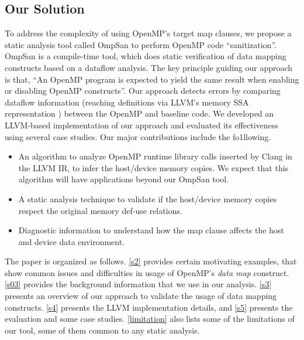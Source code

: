 \subsection{Our Solution}
To address the complexity of using OpenMP's target map 
clauses, we propose a static analysis 
tool called OmpSan to perform OpenMP code ``sanitization''.
OmpSan is a compile-time tool, which does static verification 
of data mapping constructs based on a dataflow analysis.
The key principle guiding our approach is that, ``An OpenMP program is expected to yield the same result when enabling
or disabling OpenMP constructs''.
Our approach detects errors by comparing 
dataflow information (reaching definitions via
LLVM's memory SSA representation \cite{llvm-memoryssa-url}) 
between the OpenMP and baseline code.  We developed an
LLVM-based implementation of our approach and evaluated its
effectiveness using several case studies.
Our major contributions include the fo1llowing.
\begin{itemize}
\vspace{-3pt}
\item An algorithm to analyze OpenMP runtime library calls inserted by Clang in the LLVM IR, to infer the host/device memory copies. We expect 
that this algorithm will have applications beyond our OmpSan tool. 
\item A static analysis technique to validate if the host/device memory copies respect the original memory def-use relations. 
\item Diagnostic information to understand how the map clause affects the 
host and device data environment. 
\end{itemize}\vspace{-10pt}
The paper is organized as follows. 
\autoref{s2} provides certain motivating examples, 
that show common issues  and difficulties in usage of 
OpenMP's \textit{data map} construct. 
\autoref{s03} provides the background information 
that we use in our analysis.
\autoref{s3} presents an overview of our approach to validate 
the usage of data mapping constructs. 
\autoref{s4} presents the LLVM implementation details, and 
\autoref{s5} presents the evaluation and some case studies. 
\autoref{limitation} also lists some of the limitations of 
our tool, some of them common to any static analysis.  
